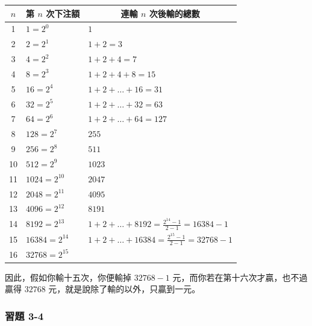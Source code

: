 \begin{table}[htbp]
\centering
\small
\renewcommand{\arraystretch}{1.2}
\begin{tabular}{|c|l|l|}
\hline
$n$ & \multicolumn{1}{c|}{第 $n$ 次下注額} & \multicolumn{1}{c|}{連輸 $n$ 次後輸的總數} \\ \hline
1  & $1 = 2^0$      & $1$ \\ \hline
2  & $2 = 2^1$      & $1+2 = 3$ \\ \hline
3  & $4 = 2^2$      & $1+2+4 = 7$ \\ \hline
4  & $8 = 2^3$      & $1+2+4+8 = 15$ \\ \hline
5  & $16 = 2^4$     & $1+2+\dots+16 = 31$ \\ \hline
6  & $32 = 2^5$     & $1+2+\dots+32 = 63$ \\ \hline
7  & $64 = 2^6$     & $1+2+\dots+64 = 127$ \\ \hline
8  & $128 = 2^7$    & $255$ \\ \hline
9  & $256 = 2^8$    & $511$ \\ \hline
10 & $512 = 2^9$    & $1023$ \\ \hline
11 & $1024 = 2^{10}$ & $2047$ \\ \hline
12 & $2048 = 2^{11}$ & $4095$ \\ \hline
13 & $4096 = 2^{12}$ & $8191$ \\ \hline
14 & $8192 = 2^{13}$ & $1+2+\dots+8192 = \frac{2^{14}-1}{2-1} = 16384-1$ \\ \hline
15 & $16384 = 2^{14}$ & $1+2+\dots+16384 = \frac{2^{15}-1}{2-1} = 32768-1$ \\ \hline
16 & $32768 = 2^{15}$ & \\ \hline
\end{tabular}
\end{table}

因此，假如你輸十五次，你便輸掉 $32768-1$ 元，而你若在第十六次才贏，也不過贏得 $32768$ 元，就是說除了輸的以外，只贏到一元。

\subsubsection*{習題 3-4}\label{sec:ex3-4}


